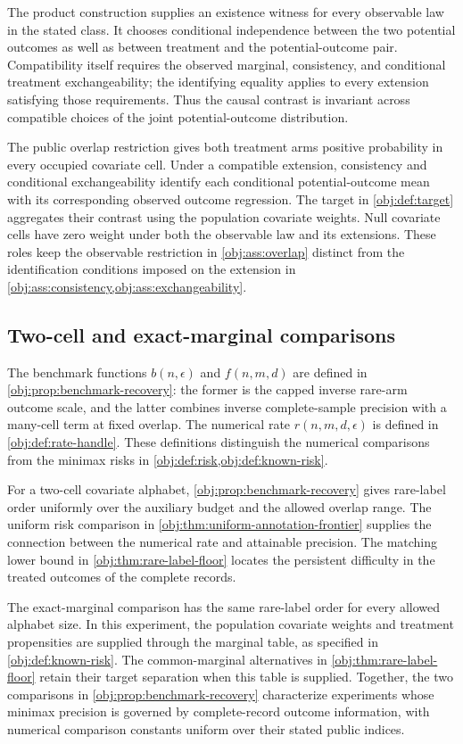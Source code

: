 The product construction supplies an existence witness for every observable law in the stated class. It chooses conditional independence between the two potential outcomes as well as between treatment and the potential-outcome pair. Compatibility itself requires the observed marginal, consistency, and conditional treatment exchangeability; the identifying equality applies to every extension satisfying those requirements. Thus the causal contrast is invariant across compatible choices of the joint potential-outcome distribution.

The public overlap restriction gives both treatment arms positive probability in every occupied covariate cell. Under a compatible extension, consistency and conditional exchangeability identify each conditional potential-outcome mean with its corresponding observed outcome regression. The target in \cref{obj:def:target} aggregates their contrast using the population covariate weights. Null covariate cells have zero weight under both the observable law and its extensions. These roles keep the observable restriction in \cref{obj:ass:overlap} distinct from the identification conditions imposed on the extension in \cref{obj:ass:consistency,obj:ass:exchangeability}.

\subsection{Two-cell and exact-marginal comparisons}

The benchmark functions \(b(n,\epsilon)\) and \(f(n,m,d)\) are defined in \cref{obj:prop:benchmark-recovery}: the former is the capped inverse rare-arm outcome scale, and the latter combines inverse complete-sample precision with a many-cell term at fixed overlap. The numerical rate \(r(n,m,d,\epsilon)\) is defined in \cref{obj:def:rate-handle}. These definitions distinguish the numerical comparisons from the minimax risks in \cref{obj:def:risk,obj:def:known-risk}.

For a two-cell covariate alphabet, \cref{obj:prop:benchmark-recovery} gives rare-label order uniformly over the auxiliary budget and the allowed overlap range. The uniform risk comparison in \cref{obj:thm:uniform-annotation-frontier} supplies the connection between the numerical rate and attainable precision. The matching lower bound in \cref{obj:thm:rare-label-floor} locates the persistent difficulty in the treated outcomes of the complete records.

The exact-marginal comparison has the same rare-label order for every allowed alphabet size. In this experiment, the population covariate weights and treatment propensities are supplied through the marginal table, as specified in \cref{obj:def:known-risk}. The common-marginal alternatives in \cref{obj:thm:rare-label-floor} retain their target separation when this table is supplied. Together, the two comparisons in \cref{obj:prop:benchmark-recovery} characterize experiments whose minimax precision is governed by complete-record outcome information, with numerical comparison constants uniform over their stated public indices.

